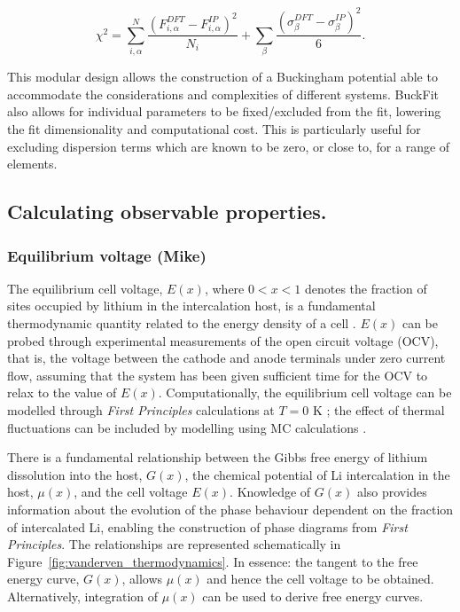\documentclass[../main.tex]{subfiles}
\begin{document}
\begin{equation}
    \chi^2 = \sum^{N}_{i,\alpha} \frac{(F^{DFT}_{i,\alpha} - F^{IP}_{i,\alpha})^2}{N_i} +  \sum_{\beta} \frac{(\sigma^{DFT}_{\beta} - \sigma^{IP}_{\beta})^2}{6}.
\end{equation}

This modular design allows the construction of a Buckingham potential able to accommodate the considerations and complexities of different systems. BuckFit also allows for individual parameters to be fixed/excluded from the fit, lowering the fit dimensionality and computational cost. This is particularly useful for excluding dispersion terms which are known to be zero, or close to, for a range of elements.\cite{Lee2013_lithium,fisher2008lithium}

\subsection{Calculating observable properties.}
\subsubsection{Equilibrium voltage (Mike)}
\label{sec:properties_equilibriumvoltage}
The equilibrium cell voltage, $E(x)$, where $0 < x < 1$ denotes the fraction of sites occupied by lithium in the intercalation host, is a fundamental thermodynamic quantity related to the energy density of a cell \cite{Urban2016,CEDER1999131,VanderVen2020}. $E(x)$ can be probed through experimental measurements of the open circuit voltage (OCV), that is, the voltage between the cathode and anode terminals under zero current flow, assuming that the system has been given sufficient time for the OCV to relax to the value of $E(x)$. Computationally, the equilibrium cell voltage can be modelled through \textit{First Principles} calculations at $T = 0$ K \cite{Urban2016,CEDER1999131,VanderVen2020}; the effect of thermal fluctuations can be included by modelling using MC calculations \cite{mercer_influence_2017,Kim2001h}.

There is a fundamental relationship between the Gibbs free energy of lithium dissolution into the host, $G(x)$, the chemical potential of Li intercalation in the host, $\mu(x)$, and the cell voltage $E(x)$. Knowledge of $G(x)$ also provides information about the evolution of the phase behaviour dependent on the fraction of intercalated Li,\cite{CEDER1999131,persson2010,VanderVen2020,VanDerVen2000b} enabling the construction of phase diagrams from \textit{First Principles}. The relationships are represented schematically in Figure~\ref{fig:vanderven_thermodynamics}. In essence: the tangent to the free energy curve, $G(x)$, allows $\mu(x)$ and hence the cell voltage to be obtained. Alternatively, integration of $\mu(x)$ can be used to derive free energy curves.
\end{document}
